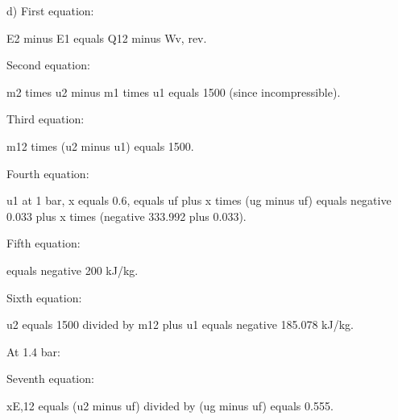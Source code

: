 d) First equation:

E2 minus E1 equals Q12 minus Wv, rev.

Second equation:

m2 times u2 minus m1 times u1 equals 1500 (since incompressible).

Third equation:

m12 times (u2 minus u1) equals 1500.

Fourth equation:

u1 at 1 bar, x equals 0.6, equals uf plus x times (ug minus uf) equals negative 0.033 plus x times (negative 333.992 plus 0.033).

Fifth equation:

equals negative 200 kJ/kg.

Sixth equation:

u2 equals 1500 divided by m12 plus u1 equals negative 185.078 kJ/kg.

At 1.4 bar:

Seventh equation:

xE,12 equals (u2 minus uf) divided by (ug minus uf) equals 0.555.